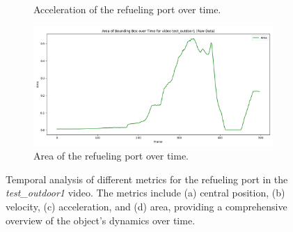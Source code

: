 \documentclass[12pt,oneside]{book} %
\begin{document}
\begin{figure}[H]
\begin{subfigure}[t]{0.6\textwidth}
        \caption{Acceleration of the refueling port over time.}
        \label{fig:acceleration-test-outdoor1}
    \end{subfigure}
    \hfill
    \begin{subfigure}[t]{0.6\textwidth}
        \includegraphics[width=\textwidth]{figures/bbox_metrics/test_outdoor1 (Raw Data)_area.png}
        \caption{Area of the refueling port over time.}
        \label{fig:size-test-outdoor1}
    \end{subfigure}
    \caption{Temporal analysis of different metrics for the refueling port in the \textit{test\_outdoor1} video. The metrics include (a) central position, (b) velocity, (c) acceleration, and (d) area, providing a comprehensive overview of the object's dynamics over time.}
    \label{fig:bbox-metrics-test-outdoor1}
\end{figure}
\end{document}
